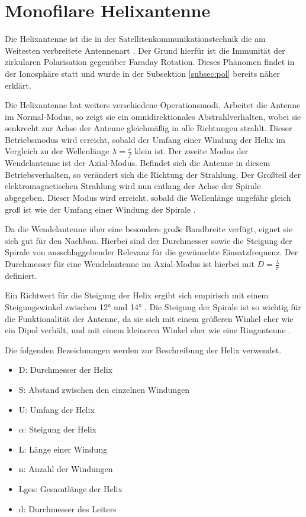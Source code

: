 \section{Monofilare Helixantenne}
Die Helixantenne ist die in der Satellitenkommunikationstechnik die am Weitesten verbreitete Antennenart \cite{HelicalAntennas}. Der Grund hierfür ist die Immunität der zirkularen Polarisation gegenüber Faraday Rotation. Dieses Phänomen findet in der Ionosphäre statt \cite{takashi_encyclopedia_2003} und wurde in der Subsektion \ref{subsec:pol} bereits näher erklärt.

Die Helixantenne hat weiters verschiedene Operationsmodi. Arbeitet die Antenne im Normal-Modus, so zeigt sie ein omnidirektionales Abstrahlverhalten, wobei sie senkrecht zur Achse der Antenne gleichmäßig in alle Richtungen strahlt. Dieser Betriebsmodus wird erreicht, sobald der Umfang einer Windung der Helix im Vergleich zu der Wellenlänge $\lambda=\frac{c}{f}$ klein ist. Der zweite Modus der Wendelantenne ist der Axial-Modus. Befindet sich die Antenne in diesem Betriebsverhalten, so verändert sich die Richtung der Strahlung. Der Großteil der elektromagnetischen Strahlung wird nun entlang der Achse der Spirale abgegeben. Dieser Modus wird erreicht, sobald die Wellenlänge ungefähr gleich groß ist wie der Umfang einer Windung der Spirale \cite{HelicalAntennas}.

Da die Wendelantenne über eine besonders große Bandbreite verfügt, eignet sie sich gut für den Nachbau. Hierbei sind der Durchmesser sowie die Steigung der Spirale von ausschlaggebender Relevanz für die gewünschte Einsatzfrequenz. Der Durchmesser für eine Wendelantenne im Axial-Modus ist hierbei mit $D=\frac{\lambda}{\pi}$ definiert.

Ein Richtwert für die Steigung der Helix ergibt sich empirisch mit einem Steigungswinkel zwischen 12° und 14° \cite{helixWebsite}. Die Steigung der Spirale ist so wichtig für die Funktionalität der Antenne, da sie sich mit einem größeren Winkel eher wie ein Dipol verhält, und mit einem kleineren Winkel eher wie eine Ringantenne \cite{Kraus-2002-AntennasB}.

Die folgenden Bezeichnungen werden zur Beschreibung der Helix verwendet.
\begin{itemize}
	\item D: Durchmesser der Helix
	\item S: Abstand zwischen den einzelnen Windungen
	\item U: Umfang der Helix
	\item $\alpha$: Steigung der Helix
	\item L: Länge einer Windung
	\item n: Anzahl der Windungen
	\item Lges: Gesamtlänge der Helix
	\item d: Durchmesser des Leiters
\end{itemize}

